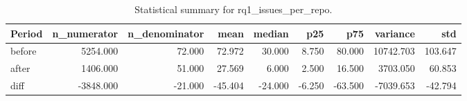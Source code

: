 \begin{table}[h]
\centering
\begin{tabular}{lrrrrrrrr}
\toprule
Period & n_numerator & n_denominator & mean & median & p25 & p75 & variance & std \\
\midrule
before & 5254.000 & 72.000 & 72.972 & 30.000 & 8.750 & 80.000 & 10742.703 & 103.647 \\
after & 1406.000 & 51.000 & 27.569 & 6.000 & 2.500 & 16.500 & 3703.050 & 60.853 \\
diff & -3848.000 & -21.000 & -45.404 & -24.000 & -6.250 & -63.500 & -7039.653 & -42.794 \\
\bottomrule
\end{tabular}
\caption{Statistical summary for rq1_issues_per_repo.}\label{tab:rq1_issues_per_repo}
\end{table}

